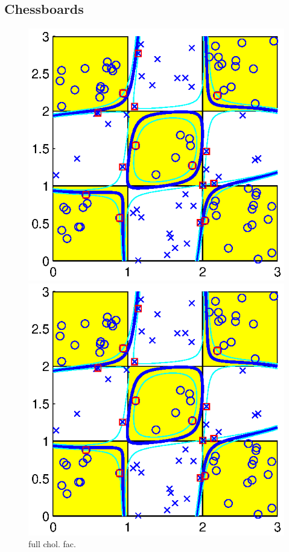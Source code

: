 \documentclass[11pt,a4paper]{article}
\theoremstyle{definition}
\begin{document}
    \subsection{Chessboards\label{Sec:Chess}}
      \begin{figure}[htbp]
        \centering
        \begin{minipage}[t]{0.24\linewidth}
          \centering
          \includegraphics[width=1\textwidth]{2_3x3_chol.eps}
          \caption{\label{Fig:ex2_1}full chol. fac.}
        \end{minipage}
        \begin{minipage}[t]{0.24\linewidth}
          \centering
          \includegraphics[width=1\textwidth]{2_3x3_pchol_1.eps}

\end{minipage}
\end{figure}
\end{document}
